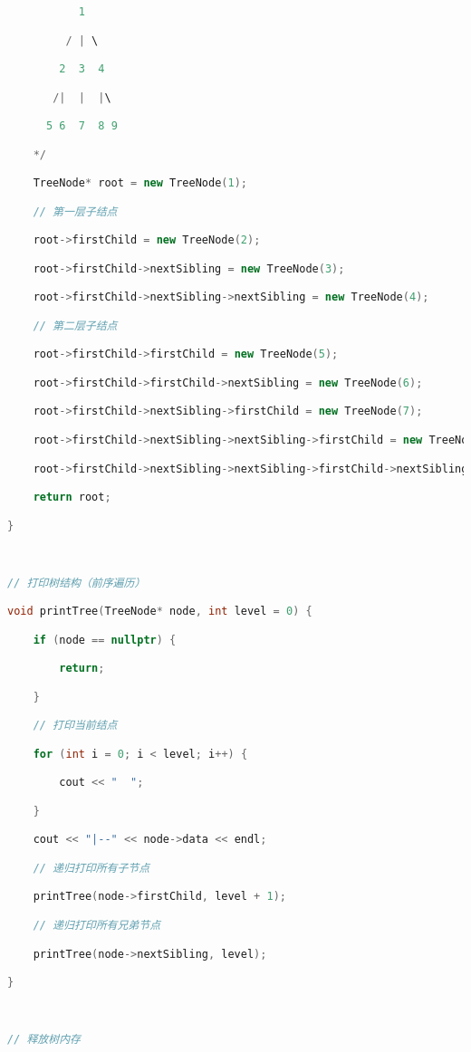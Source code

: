 \begin{lstlisting}[language=C++]
           1

         / | \

        2  3  4

       /|  |  |\

      5 6  7  8 9

    */

    TreeNode* root = new TreeNode(1);

    // 第一层子结点

    root->firstChild = new TreeNode(2);

    root->firstChild->nextSibling = new TreeNode(3);

    root->firstChild->nextSibling->nextSibling = new TreeNode(4);

    // 第二层子结点

    root->firstChild->firstChild = new TreeNode(5);

    root->firstChild->firstChild->nextSibling = new TreeNode(6);

    root->firstChild->nextSibling->firstChild = new TreeNode(7);

    root->firstChild->nextSibling->nextSibling->firstChild = new TreeNode(8);

    root->firstChild->nextSibling->nextSibling->firstChild->nextSibling = new TreeNode(9);

    return root;

}

  

// 打印树结构（前序遍历）

void printTree(TreeNode* node, int level = 0) {

    if (node == nullptr) {

        return;

    }

    // 打印当前结点

    for (int i = 0; i < level; i++) {

        cout << "  ";

    }

    cout << "|--" << node->data << endl;

    // 递归打印所有子节点

    printTree(node->firstChild, level + 1);

    // 递归打印所有兄弟节点

    printTree(node->nextSibling, level);

}

  

// 释放树内存


\end{lstlisting}
